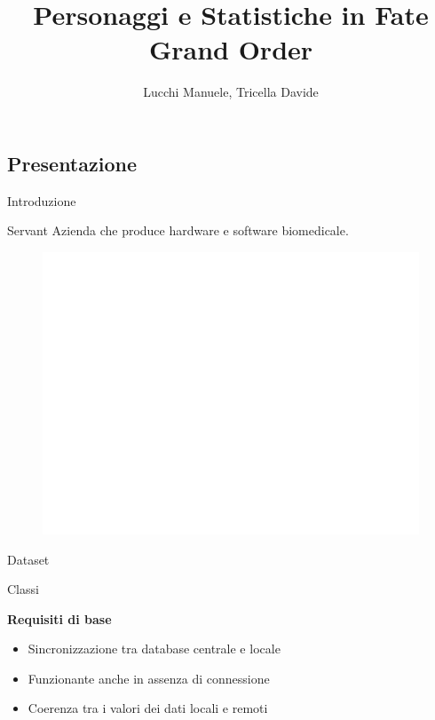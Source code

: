 \documentclass{beamer}
\title{Personaggi e Statistiche in Fate Grand Order} %
\author{Lucchi Manuele, Tricella Davide}
\begin{document}
\frame[c]{\maketitle}

\begin{darkframes}

  \section{Presentazione}

  \begin{frame}{Introduzione}

    \begin{block}{Servant}
      Azienda che produce hardware e software biomedicale.
    \end{block}

    \begin{figure}
      \centering
      \hspace{-1cm}
      \includegraphics[scale=0.325]{./images/growth.png}
    \end{figure}

  \end{frame}

  \begin{frame}{Dataset}


  \end{frame}

  \begin{frame}{Classi}

    \textbf{Requisiti di base}
    \begin{itemize}
      \item Sincronizzazione tra database centrale e locale
      \item Funzionante anche in assenza di connessione
      \item Coerenza tra i valori dei dati locali e remoti
    \end{itemize}


\end{frame}
\end{darkframes}
\end{document}
